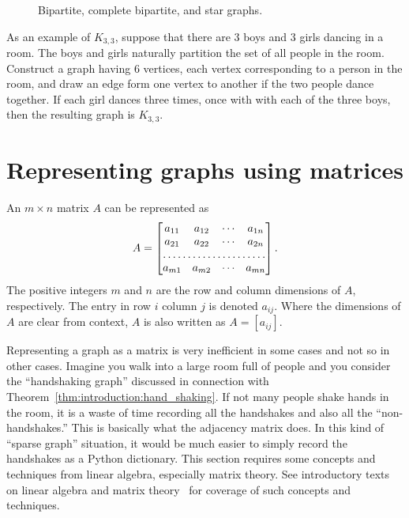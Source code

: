 \begin{figure}[!htbp]
\centering

\caption{Bipartite, complete bipartite, and star graphs.}
\label{fig:introduction:bipartite_complete_bipartite_graphs}
\end{figure}

As an example of $K_{3,3}$, suppose that there are $3$ boys and $3$
girls dancing in a room. The boys and girls naturally partition the
set of all people in the room. Construct a graph having $6$ vertices,
each vertex corresponding to a person in the room, and draw an edge
form one vertex to another if the two people dance together. If each
girl dances three times, once with with each of the three boys, then
the resulting graph is $K_{3,3}$.



\section{Representing graphs using matrices}
\label{sec:introduction:matrix_representation}

An $m \times n$ matrix $A$ can be represented as
\[
A
=
\begin{bmatrix}
a_{11} & a_{12} & \cdots & a_{1n} \\
a_{21} & a_{22} & \cdots & a_{2n} \\
\hdotsfor{4} \\
a_{m1} & a_{m2} & \cdots & a_{mn} \\
\end{bmatrix}.
\]
The positive integers $m$ and $n$ are the row and column dimensions of
$A$, respectively. The entry in row $i$ column $j$ is denoted
$a_{ij}$. Where the dimensions of $A$ are clear from context, $A$ is
also written as $A = [a_{ij}]$.

Representing a graph as a matrix is very inefficient in some cases and
not so in other cases. Imagine you walk into a large room full of
people and you consider the ``handshaking graph'' discussed in
connection with Theorem~\ref{thm:introduction:hand_shaking}. If not
many people shake hands in the room, it is a waste of time recording
all the handshakes and also all the ``non-handshakes.'' This is
basically what the adjacency matrix does. In this kind of
``sparse graph'' situation, it would be much easier to simply record
the handshakes as a Python dictionary. This section requires some
concepts and techniques from linear algebra, especially matrix
theory. See introductory texts on linear algebra and matrix
theory~\cite{Beezer2009} for coverage of such concepts and techniques.


